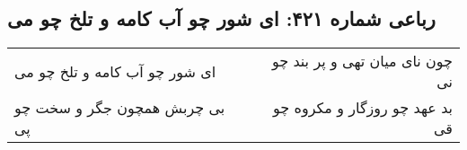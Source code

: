 \begin{center}
\section*{رباعی شماره ۴۲۱: ای شور چو آب کامه و تلخ چو می}
\label{sec:sh421}
\begin{longtable}{l p{0.5cm} r}
ای شور چو آب کامه و تلخ چو می
&&
چون نای میان تهی و پر بند چو نی
\\
بی چربش همچون جگر و سخت چو پی
&&
بد عهد چو روزگار و مکروه چو قی
\\
\end{longtable}
\end{center}
